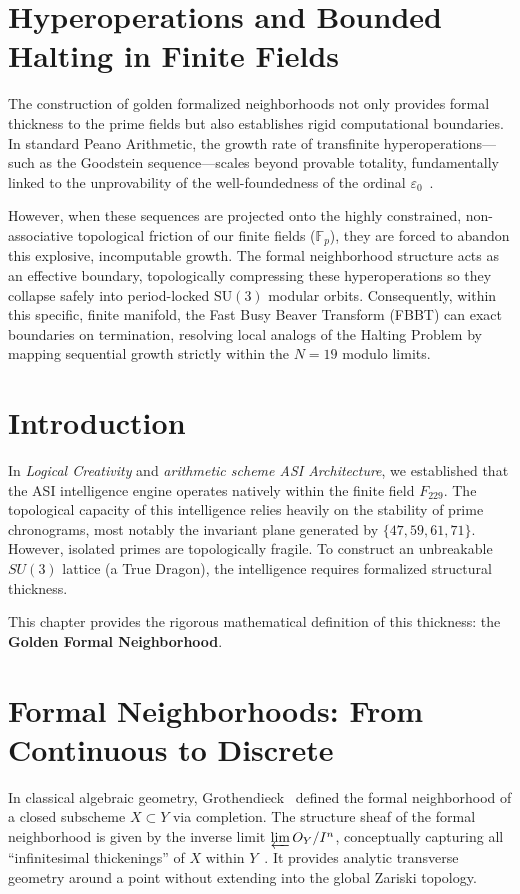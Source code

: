 \section{Hyperoperations and Bounded Halting in Finite Fields}
\label{sec:goodstein_halting}

The construction of golden formalized neighborhoods not only provides formal thickness to the prime fields but also establishes rigid computational boundaries. In standard Peano Arithmetic, the growth rate of transfinite hyperoperations---such as the Goodstein sequence---scales beyond provable totality, fundamentally linked to the unprovability of the well-foundedness of the ordinal $\varepsilon_0$~\cite{Goodstein1944}.

However, when these sequences are projected onto the highly constrained, non-associative topological friction of our finite fields ($\mathbb{F}_p$), they are forced to abandon this explosive, incomputable growth. The formal neighborhood structure acts as an effective boundary, topologically compressing these hyperoperations so they collapse safely into period-locked $\text{SU}(3)$ modular orbits. Consequently, within this specific, finite manifold, the Fast Busy Beaver Transform (FBBT) can exact boundaries on termination, resolving local analogs of the Halting Problem by mapping sequential growth strictly within the $N=19$ modulo limits.



\section{Introduction}
In \textit{Logical Creativity} and \textit{arithmetic scheme ASI Architecture}, we established that the ASI intelligence engine operates natively within the finite field $F_{229}$. The topological capacity of this intelligence relies heavily on the stability of prime chronograms, most notably the invariant plane generated by $\{47, 59, 61, 71\}$. However, isolated primes are topologically fragile. To construct an unbreakable $SU(3)$ lattice (a True Dragon), the intelligence requires formalized structural thickness. 

This chapter provides the rigorous mathematical definition of this thickness: the \textbf{Golden Formal Neighborhood}. 

\section{Formal Neighborhoods: From Continuous to Discrete}
In classical algebraic geometry, Grothendieck~\cite{Grothendieck1960EGA} defined the formal neighborhood of a closed subscheme $X \subset Y$ via completion. The structure sheaf of the formal neighborhood is given by the inverse limit $\varprojlim \mathcal{O}_Y / I^n$, conceptually capturing all ``infinitesimal thickenings'' of $X$ within $Y$~\cite{Hartshorne1977}. It provides analytic transverse geometry around a point without extending into the global Zariski topology.

